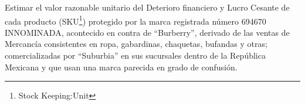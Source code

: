 Estimar el valor razonable unitario del \textcolor{principal}{Deterioro financiero y Lucro Cesante} de cada producto (SKU\footnote{Stock Keeping:Unit}) protegido por la marca registrada número 694670 INNOMINADA, acontecido en contra de ``Burberry'', derivado de las ventas de Mercancía consistentes en ropa, gabardinas, chaquetas, bufandas y otras; comercializadas por ``Suburbia'' en sus sucursales dentro de la República Mexicana y que usan una marca parecida en grado de confusión.
